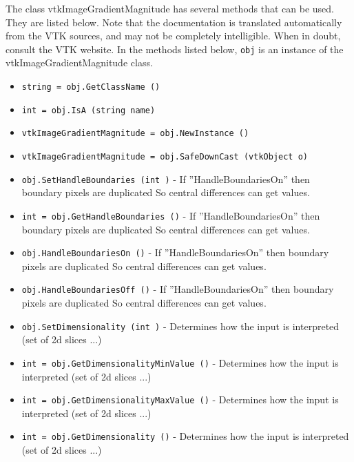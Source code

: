 The class vtkImageGradientMagnitude has several methods that can be used.
  They are listed below.
Note that the documentation is translated automatically from the VTK sources,
and may not be completely intelligible.  When in doubt, consult the VTK website.
In the methods listed below, \verb|obj| is an instance of the vtkImageGradientMagnitude class.
\begin{itemize}
\item  \verb|string = obj.GetClassName ()|

\item  \verb|int = obj.IsA (string name)|

\item  \verb|vtkImageGradientMagnitude = obj.NewInstance ()|

\item  \verb|vtkImageGradientMagnitude = obj.SafeDownCast (vtkObject o)|

\item  \verb|obj.SetHandleBoundaries (int )| -  If ''HandleBoundariesOn'' then boundary pixels are duplicated
 So central differences can get values.

\item  \verb|int = obj.GetHandleBoundaries ()| -  If ''HandleBoundariesOn'' then boundary pixels are duplicated
 So central differences can get values.

\item  \verb|obj.HandleBoundariesOn ()| -  If ''HandleBoundariesOn'' then boundary pixels are duplicated
 So central differences can get values.

\item  \verb|obj.HandleBoundariesOff ()| -  If ''HandleBoundariesOn'' then boundary pixels are duplicated
 So central differences can get values.

\item  \verb|obj.SetDimensionality (int )| -  Determines how the input is interpreted (set of 2d slices ...)

\item  \verb|int = obj.GetDimensionalityMinValue ()| -  Determines how the input is interpreted (set of 2d slices ...)

\item  \verb|int = obj.GetDimensionalityMaxValue ()| -  Determines how the input is interpreted (set of 2d slices ...)

\item  \verb|int = obj.GetDimensionality ()| -  Determines how the input is interpreted (set of 2d slices ...)

\end{itemize}

